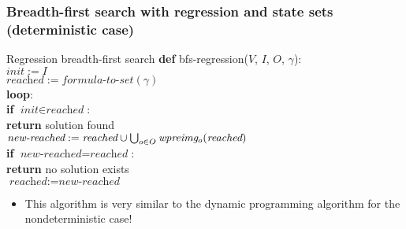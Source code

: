 \documentclass{gkibeamer}
\begin{document}
\begin{frame}[t]
  \frametitle{Breadth-first search with regression and
    state sets (deterministic case)}

  \begin{block}{Regression breadth-first search}
    \textbf{def} bfs-regression($V$, $I$, $O$, $\gamma$): \\
    {}\qquad$\textit{init} := I$ \\
    {}\qquad$\textit{reached} := \textit{formula-to-set}(\gamma)$ \\
    {}\qquad\textbf{loop}: \\
    {}\qquad\qquad\textbf{if} $\textit{init} \in
    \textit{reached}$: \\
    {}\qquad\qquad\qquad\textbf{return} solution found \\
    {}\qquad\qquad$\textit{new-reached} := \textit{reached} \cup
    \bigcup_{o \in O} \wpreimage{o}{\textit{reached}}$ \\
    {}\qquad\qquad\textbf{if} $\textit{new-reached} = 
    \textit{reached}$: \\
    {}\qquad\qquad\qquad\textbf{return} no solution exists \\
    {}\qquad\qquad$\textit{reached} := \textit{new-reached}$
  \end{block}
  
  \begin{itemize}
  \item This algorithm is very similar to the dynamic programming
    algorithm for the nondeterministic case!
  \end{itemize}
\end{frame}
\end{document}
